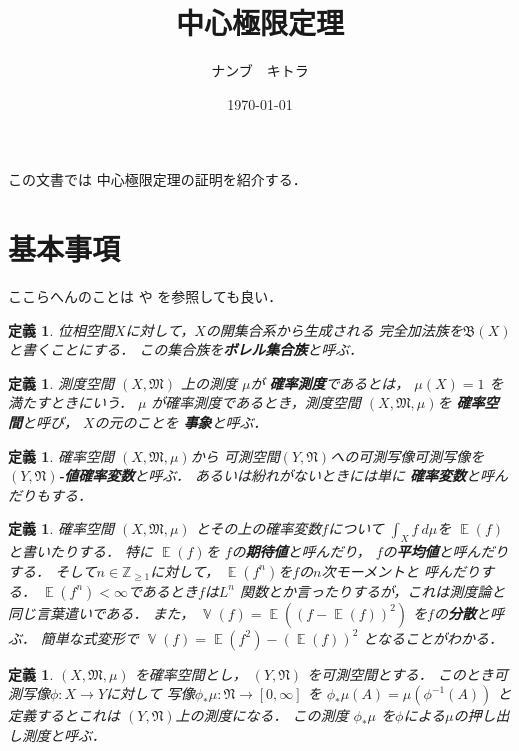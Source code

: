 \documentclass[leqno, 12pt]{jsarticle}
\title{中心極限定理}
\author{ナンブ　キトラ}
\date{\today}
\newtheorem{df}[thm]{定義}
\newcommand{\zz}{\mathbb{Z}}
\DeclareMathOperator{\mean}{\mathbb{E}}
\DeclareMathOperator{\varian}{\mathbb{V}}
\begin{document}
\maketitle

この文書では
中心極限定理の証明を紹介する．

\section{基本事項}

ここらへんのことは
\cite{hatena0}や\cite{hatena1}
を参照しても良い．
\begin{df}
位相空間$X$に対して，$X$の開集合系から生成される
完全加法族を$\mathfrak{B}(X)$と書くことにする．
この集合族を\textbf{ボレル集合族}と呼ぶ．
\end{df}

\begin{df}
測度空間
$(X, \mathfrak{M})$
上の測度
$\mu$が
\textbf{確率測度}であるとは，
$\mu(X)=1$
を満たすときにいう．
$\mu$
が確率測度であるとき，測度空間
$(X, \mathfrak{M}, \mu)$を
\textbf{確率空間}と呼び，
$X$の元のことを
\textbf{事象}と呼ぶ．
\end{df}

\begin{df}
確率空間
$(X, \mathfrak{M}, \mu)$から
可測空間$(Y, \mathfrak{N})$への可測写像可測写像を
\textbf{$(Y, \mathfrak{N})$-値確率変数}と呼ぶ．
あるいは紛れがないときには単に
\textbf{確率変数}と呼んだりもする．
\end{df}

\begin{df}
確率空間
$(X, \mathfrak{M}, \mu)$
とその上の確率変数$f$について
$\int_{X}f\ d\mu$を
$\mean(f)$と書いたりする．
特に
$\mean(f)$を
$f$の\textbf{期待値}と呼んだり，
$f$の\textbf{平均値}と呼んだりする．
そして$n\in \zz_{\ge 1}$に対して，
$\mean(f^{n})$を$f$の$n$次モーメントと
呼んだりする．
$\mean(f^{n})<\infty$であるとき$f$は$L^{n}$
関数とか言ったりするが，これは測度論と同じ言葉遣いである．
また，
$\varian(f)=\mean((f-\mean(f))^{2})$
を$f$の\textbf{分散}と呼ぶ．
簡単な式変形で
$\varian(f)=\mean(f^{2})-(\mean(f))^{2}$
となることがわかる．
\end{df}


\begin{df}
$(X, \mathfrak{M}, \mu)$
を確率空間とし，
$(Y, \mathfrak{N})$
を可測空間とする．
このとき可測写像$\phi:X\to Y$に対して
写像$\phi_{*}\mu: \mathfrak{N}\to [0, \infty]$
を
$\phi_{*}\mu(A)=\mu(\phi^{-1}(A))$
と定義するとこれは
$(Y, \mathfrak{N})$上の測度になる．
この測度
$\phi_{*}\mu$
を$\phi$による$\mu$の押し出し測度と呼ぶ．
\end{df}
\end{document}
